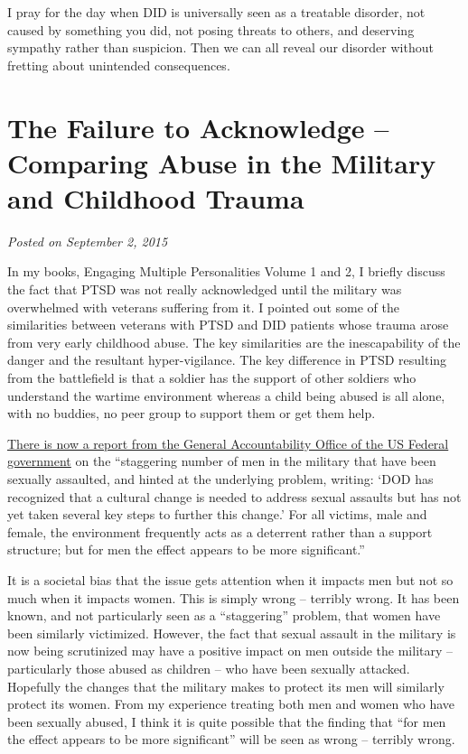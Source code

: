 \documentclass[]{book}
\begin{document}
I pray for the day when DID is universally seen as a treatable disorder, not caused by something you did, not posing threats to others, and deserving sympathy rather than suspicion. Then we can all reveal our disorder without fretting about unintended consequences.

\hypertarget{the-failure-to-acknowledge-comparing-abuse-in-the-military-and-childhood-trauma}{%
\section{The Failure to Acknowledge -- Comparing Abuse in the Military and Childhood Trauma}\label{the-failure-to-acknowledge-comparing-abuse-in-the-military-and-childhood-trauma}}

\emph{Posted on September 2, 2015}

In my books, Engaging Multiple Personalities Volume 1 and 2, I briefly discuss the fact that PTSD was not really acknowledged until the military was overwhelmed with veterans suffering from it. I pointed out some of the similarities between veterans with PTSD and DID patients whose trauma arose from very early childhood abuse. The key similarities are the inescapability of the danger and the resultant hyper-vigilance. The key difference in PTSD resulting from the battlefield is that a soldier has the support of other soldiers who understand the wartime environment whereas a child being abused is all alone, with no buddies, no peer group to support them or get them help.

\href{http://www.huffingtonpost.com/rep-niki-tsongas/support-male-survivors-of-sexual-assault_b_7832846.html}{There is now a report from the General Accountability Office of the US Federal government} on the ``staggering number of men in the military that have been sexually assaulted, and hinted at the underlying problem, writing: `DOD has recognized that a cultural change is needed to address sexual assaults but has not yet taken several key steps to further this change.' For all victims, male and female, the environment frequently acts as a deterrent rather than a support structure; but for men the effect appears to be more significant.''

It is a societal bias that the issue gets attention when it impacts men but not so much when it impacts women. This is simply wrong -- terribly wrong. It has been known, and not particularly seen as a ``staggering'' problem, that women have been similarly victimized. However, the fact that sexual assault in the military is now being scrutinized may have a positive impact on men outside the military -- particularly those abused as children -- who have been sexually attacked. Hopefully the changes that the military makes to protect its men will similarly protect its women. From my experience treating both men and women who have been sexually abused, I think it is quite possible that the finding that ``for men the effect appears to be more significant'' will be seen as wrong -- terribly wrong.
\end{document}

